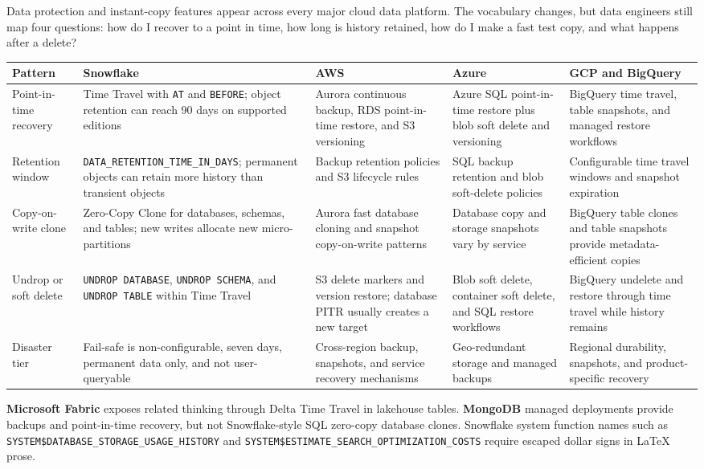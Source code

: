\begin{crosscloud}
Data protection and instant-copy features appear across every major cloud data platform. The vocabulary changes, but data engineers still map four questions: how do I recover to a point in time, how long is history retained, how do I make a fast test copy, and what happens after a delete?
\vspace{2mm}
{\footnotesize
\begin{tabular}{@{}p{2.5cm}p{3.0cm}p{3.1cm}p{3.1cm}p{3.1cm}@{}}
\toprule
\textbf{Pattern} & \textbf{Snowflake} & \textbf{AWS} & \textbf{Azure} & \textbf{GCP and BigQuery} \\
\midrule
Point-in-time recovery & Time Travel with \texttt{AT} and \texttt{BEFORE}; object retention can reach 90 days on supported editions & Aurora continuous backup, RDS point-in-time restore, and S3 versioning & Azure SQL point-in-time restore plus blob soft delete and versioning & BigQuery time travel, table snapshots, and managed restore workflows \\
Retention window & \texttt{DATA\_RETENTION\_TIME\_IN\_DAYS}; permanent objects can retain more history than transient objects & Backup retention policies and S3 lifecycle rules & SQL backup retention and blob soft-delete policies & Configurable time travel windows and snapshot expiration \\
Copy-on-write clone & Zero-Copy Clone for databases, schemas, and tables; new writes allocate new micro-partitions & Aurora fast database cloning and snapshot copy-on-write patterns & Database copy and storage snapshots vary by service & BigQuery table clones and table snapshots provide metadata-efficient copies \\
Undrop or soft delete & \texttt{UNDROP DATABASE}, \texttt{UNDROP SCHEMA}, and \texttt{UNDROP TABLE} within Time Travel & S3 delete markers and version restore; database PITR usually creates a new target & Blob soft delete, container soft delete, and SQL restore workflows & BigQuery undelete and restore through time travel while history remains \\
Disaster tier & Fail-safe is non-configurable, seven days, permanent data only, and not user-queryable & Cross-region backup, snapshots, and service recovery mechanisms & Geo-redundant storage and managed backups & Regional durability, snapshots, and product-specific recovery \\
\bottomrule
\end{tabular}}
\vspace{1mm}
\textbf{Microsoft Fabric} exposes related thinking through Delta Time Travel in lakehouse tables. \textbf{MongoDB} managed deployments provide backups and point-in-time recovery, but not Snowflake-style SQL zero-copy database clones. Snowflake system function names such as \texttt{SYSTEM\$DATABASE\_STORAGE\_USAGE\_HISTORY} and \texttt{SYSTEM\$ESTIMATE\_SEARCH\_OPTIMIZATION\_COSTS} require escaped dollar signs in LaTeX prose.
\end{crosscloud}
